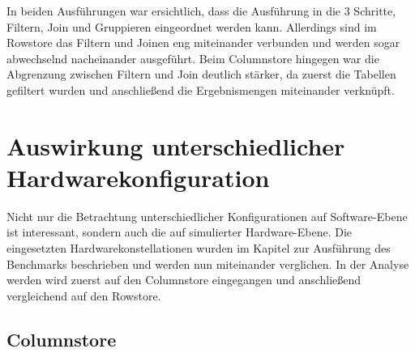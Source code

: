 In beiden Ausführungen war ersichtlich, dass die Ausführung in die 3 Schritte, Filtern, Join und Gruppieren eingeordnet werden kann. Allerdings sind im Rowstore das Filtern und Joinen eng miteinander verbunden und werden sogar abwechselnd nacheinander ausgeführt. Beim Columnstore hingegen war die Abgrenzung zwischen Filtern und Join deutlich stärker, da zuerst die Tabellen gefiltert wurden und anschließend die Ergebnismengen miteinander verknüpft.

\graphicspath{{images/indizes/}}


\graphicspath{{images/}}






\section{Auswirkung unterschiedlicher Hardwarekonfiguration}\label{auswertung:hardware}

Nicht nur die Betrachtung unterschiedlicher Konfigurationen auf Software-Ebene ist interessant, 
sondern auch die auf simulierter Hardware-Ebene. Die eingesetzten Hardwarekonstellationen 
wurden im Kapitel zur Ausführung des Benchmarks beschrieben und werden nun miteinander 
verglichen. In der Analyse werden wird zuerst auf den 
Columnstore eingegangen und anschließend vergleichend auf den Rowstore. 

\subsection{Columnstore}

\begin{figure}[H]
\end{figure}


